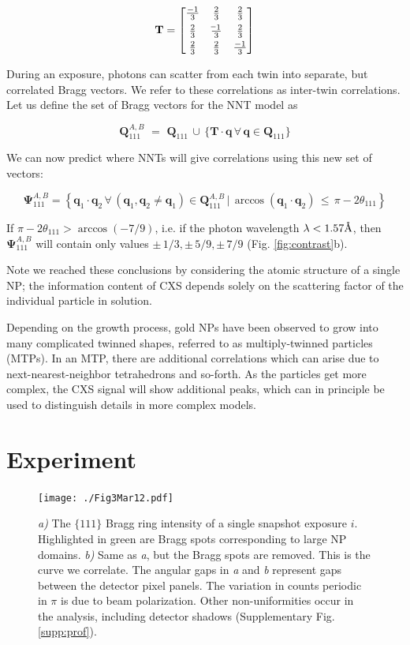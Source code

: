 \documentclass [12pt,fleqn]{article}
\newcommand*{\matminus}{%
  \leavevmode
  \hphantom{0}%
  \llap{%
    \settowidth{\dimen0 }{$0$}%
    \resizebox{1.1\dimen0 }{\height}{$-$}%
  }%
}
\newcommand{\angstrom}{\textup{\AA}}
\def \be {\begin{equation}}
\def \ee {\end{equation}}
\begin{document}
\be \label{twinmat}
\mathbf T = \begin{bmatrix}
       \frac{-1}{3} & \frac{2}{3} & \frac{2}{3}           \\[0.3em]
       \frac{2}{3} & \frac{\matminus 1}{3}           & \frac{2}{3} \\[0.3em]
       \frac{2}{3}           & \frac{2}{3} & \frac{-1}{3}
     \end{bmatrix}
\ee

During an exposure, photons can scatter from each twin into separate, but correlated Bragg vectors. We refer to these correlations as inter-twin correlations. Let us define the set of Bragg vectors for the NNT model as 

\be
\bm Q^{A,B}_{111}\,\, =\,\, \bm Q_{111} \, \cup \, \big \{  \mathbf T  \cdot \bm q \, \forall \, \bm q \in \bm Q_{111} \big \}
\ee

We can now predict where NNTs will give correlations using this new set of vectors: 

\be \label{psisetab}
\bm \Psi^{A,B}_{111} = \left \{  \bm q_1 \cdot \bm q_2  \, \forall \, (\bm q_1, \bm q_2 \ne \bm q_1) \in \bm Q^{A,B}_{111}\, \big | \,  \arccos ( \bm q_1\cdot  \bm q_2  ) \, \le \, \pi -   2\theta_{111}     \right \}
\ee

If $\pi - 2\theta_{111} > \arccos(-7/9)$, i.e. if the photon wavelength $\lambda < 1.57 \angstrom$, then $\bm \Psi^{A,B}_{111}$ will contain only values $\pm \,1/3, \pm \,5/9, \pm\, 7/9$ (Fig. \ref{fig:contrast}b).

Note we reached these conclusions by considering the atomic structure of a single NP; the information content of CXS depends solely on the scattering factor of the individual particle in solution.

Depending on the growth process, gold NPs have been observed to grow into many complicated twinned shapes, referred to as multiply-twinned particles (MTPs). In an MTP, there are additional correlations which can arise due to next-nearest-neighbor tetrahedrons and so-forth. As the particles get more complex, the CXS signal will show additional peaks, which can in principle be used to distinguish details in more complex models. 

\section{Experiment}
\begin{figure}[H]
\centering
\texttt{[image: ./Fig3Mar12.pdf]}
\caption{ \emph{a)} The $\{111\}$ Bragg ring intensity of a single snapshot exposure $i$. Highlighted in green are Bragg spots corresponding to large NP domains. \emph{b)} Same as \emph{a}, but the Bragg spots are removed. This is the curve we correlate. The angular gaps in \emph{a} and \emph{b} represent gaps between the detector pixel panels. The variation in counts periodic in $\pi$ is due to beam polarization. Other non-uniformities occur in the analysis, including detector shadows (Supplementary Fig. \ref{supp:prof}).}
\label{fig:peaks_rm}
\end{figure}
\end{document}
